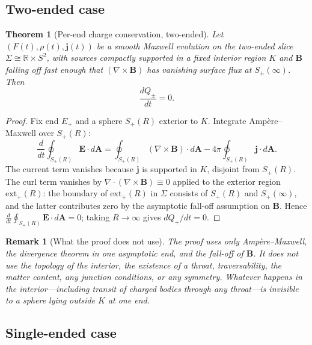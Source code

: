 \documentclass[aps,prd,onecolumn,nofootinbib,superscriptaddress]{revtex4-2}
\newtheorem{theorem}{Theorem}
\newtheorem{remark}{Remark}
\begin{document}
\subsection{Two-ended case}

\begin{theorem}[Per-end charge conservation, two-ended]
\label{thm:Q-conservation-2e}
Let $(F(t),\rho(t),\bm{j}(t))$ be a smooth Maxwell evolution on the two-ended
slice $\Sigma\cong\mathbb{R}\times S^2$, with sources compactly supported in a
fixed interior region $K$ and $\bm{B}$ falling off fast enough that
$(\nabla\times\bm{B})$ has vanishing surface flux at $S_\pm(\infty)$.  Then
\begin{equation}
  \frac{dQ_\pm}{dt} = 0.
\end{equation}
\end{theorem}

\begin{proof}
Fix end $E_+$ and a sphere $S_+(R)$ exterior to $K$.  Integrate
Amp\`ere--Maxwell over $S_+(R)$:
\begin{equation}
  \frac{d}{dt}\oint_{S_+(R)}\bm{E}\cdot d\bm{A}
  = \oint_{S_+(R)}(\nabla\times\bm{B})\cdot d\bm{A}
  - 4\pi\oint_{S_+(R)}\bm{j}\cdot d\bm{A}.
\end{equation}
The current term vanishes because $\bm{j}$ is supported in $K$, disjoint from
$S_+(R)$.  The curl term vanishes by $\nabla\cdot(\nabla\times\bm{B})\equiv 0$
applied to the exterior region $\mathrm{ext}_+(R)$: the boundary of
$\mathrm{ext}_+(R)$ in $\Sigma$ consists of $S_+(R)$ and $S_+(\infty)$, and
the latter contributes zero by the asymptotic fall-off assumption on $\bm{B}$.
Hence $\frac{d}{dt}\oint_{S_+(R)}\bm{E}\cdot d\bm{A}=0$; taking $R\to\infty$
gives $dQ_+/dt=0$.
\end{proof}

\begin{remark}[What the proof does not use]
The proof uses only Amp\`ere--Maxwell, the divergence theorem in one
asymptotic end, and the fall-off of $\bm{B}$.  It does \emph{not} use the
topology of the interior, the existence of a throat, traversability, the
matter content, any junction conditions, or any symmetry.  Whatever happens in
the interior---including transit of charged bodies through any throat---is
invisible to a sphere lying outside $K$ at one end.
\end{remark}

\subsection{Single-ended case}
\end{document}
